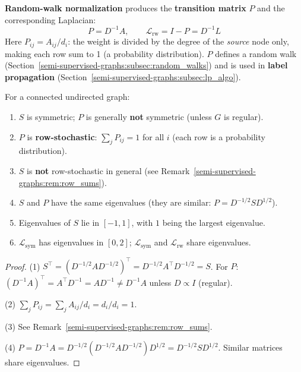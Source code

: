 \begin{notechapter}
\begin{definition}
\textbf{Random-walk normalization} produces the \textbf{transition matrix}
$P$ and the corresponding Laplacian:
\begin{equation}
P = D^{-1}A, \qquad \mathcal{L}_{\mathrm{rw}} = I - P = D^{-1}L
\end{equation}
Here $P_{ij} = A_{ij}/d_i$: the weight is divided by the degree of the
\emph{source} node only, making each row sum to 1 (a probability distribution).
$P$ defines a random walk (Section~\ref{semi-supervised-graphs:subsec:random_walks}) and is used in
\textbf{label propagation} (Section~\ref{semi-supervised-graphs:subsec:lp_algo}).
\end{definition}

\begin{proposition}
\label{semi-supervised-graphs:prop:normalized_properties}
For a connected undirected graph:
\begin{enumerate}
    \item $S$ is symmetric; $P$ is generally \textbf{not} symmetric (unless
      $G$ is regular).
    \item $P$ is \textbf{row-stochastic}: $\sum_j P_{ij} = 1$ for all $i$
      (each row is a probability distribution).
    \item $S$ is \textbf{not} row-stochastic in general
      (see Remark~\ref{semi-supervised-graphs:rem:row_sums}).
    \item $S$ and $P$ have the same eigenvalues (they are similar:
      $P = D^{-1/2}SD^{1/2}$).
    \item Eigenvalues of $S$ lie in $[-1, 1]$, with $1$ being the largest
      eigenvalue.
    \item $\mathcal{L}_{\mathrm{sym}}$ has eigenvalues in $[0, 2]$;
      $\mathcal{L}_{\mathrm{sym}}$ and $\mathcal{L}_{\mathrm{rw}}$ share
      eigenvalues.
\end{enumerate}
\end{proposition}

\begin{proof}
(1) $S^\top = (D^{-1/2}AD^{-1/2})^\top = D^{-1/2}A^\top D^{-1/2} = S$.
For $P$: $(D^{-1}A)^\top = A^\top D^{-1} = AD^{-1} \neq D^{-1}A$ unless
$D \propto I$ (regular).

(2) $\sum_j P_{ij} = \sum_j A_{ij}/d_i = d_i/d_i = 1$.

(3) See Remark~\ref{semi-supervised-graphs:rem:row_sums}.

(4) $P = D^{-1}A = D^{-1/2}(D^{-1/2}AD^{-1/2})D^{1/2}
= D^{-1/2}SD^{1/2}$. Similar matrices share eigenvalues.


\end{proof}
\end{notechapter}

